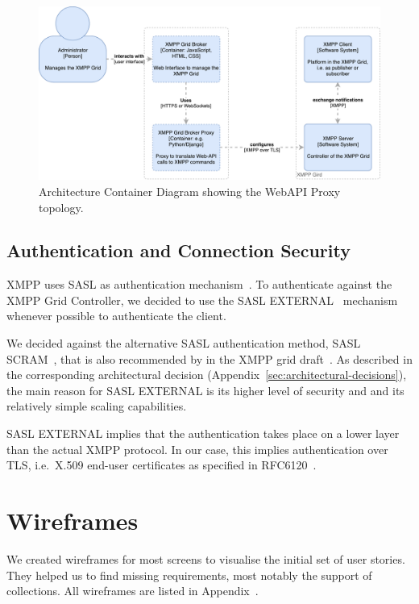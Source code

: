 \begin{figure}[h]
\centering
\includegraphics[width=0.7\linewidth]{resources/architecture_container_proxy.pdf}
\caption[Architecture Container Diagram: Web Proxy]{Architecture Container Diagram showing the WebAPI Proxy topology.}
\label{fig:architecturecontainerwebproxy}
\end{figure}


\subsection{Authentication and Connection Security}

XMPP uses SASL as authentication mechanism~\cite{rfc6120}.
To authenticate against the XMPP Grid Controller, we decided to use the SASL EXTERNAL~\cite{rfc4422} mechanism whenever possible to authenticate the client.

We decided against the alternative SASL authentication method, SASL SCRAM~\cite{rfc7677}, that is also recommended by in the XMPP grid draft~\cite{ietf-mile-xmpp-grid-05}.
As described in the corresponding architectural decision (Appendix~\ref{sec:architectural-decisions}), the main reason for SASL EXTERNAL is its higher level of security and and its relatively simple scaling capabilities.

SASL EXTERNAL implies that the authentication takes place on a lower layer than the actual XMPP protocol. In our case, this implies authentication over TLS, i.e.~X.509 end-user certificates as specified in RFC6120~\cite{rfc6120}.


\section{Wireframes}

We created wireframes for most screens to visualise the initial set of user stories.
They helped us to find missing requirements, most notably the support of collections.
All wireframes are listed in Appendix~.
